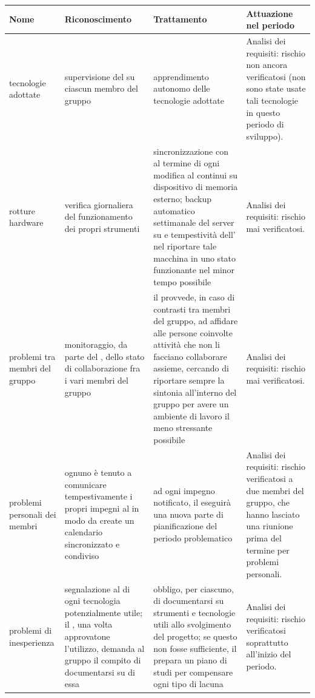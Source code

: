 \newpage

\begin{adjustwidth}{-1cm}{-1cm}
\begin{center}
\begin{longtable}{| p{3cm} | p{3.5cm} | p{4cm} | p{3cm} |}
	\hline
	\textbf{Nome} & \textbf{Riconoscimento} & \textbf{Trattamento} & \textbf{Attuazione nel periodo} \\
	\hline
	tecnologie adottate & supervisione del \Rx{} su ciascun membro del gruppo & apprendimento autonomo delle tecnologie adottate & Analisi dei requisiti: rischio non ancora verificatosi (non sono state usate tali tecnologie in questo periodo di sviluppo). \\
	rotture hardware & verifica giornaliera del funzionamento dei propri strumenti & sincronizzazione con \gloss{GitHub} al termine di ogni modifica al \gloss{repository} continui \gloss{backup} su dispositivo di memoria esterno; backup automatico settimanale del server su \gloss{AWS} e tempestività dell’\AM{} nel riportare tale macchina in uno stato funzionante nel minor tempo possibile & Analisi dei requisiti: rischio mai verificatosi. \\
	problemi tra membri del gruppo & monitoraggio, da parte del \Rx{}, dello stato di collaborazione fra i vari membri del gruppo & il \Rx{} provvede, in caso di contrasti tra membri del gruppo, ad affidare alle persone coinvolte attività che non li facciano collaborare assieme, cercando di riportare sempre la sintonia all'interno del gruppo per avere un ambiente di lavoro il meno stressante possibile & Analisi dei requisiti: rischio mai verificatosi. \\
	problemi personali dei membri & ognuno è tenuto a comunicare tempestivamente i propri impegni al \Rx{} in modo da create un calendario sincronizzato e condiviso & ad ogni impegno notificato, il \Rx{} eseguirà una nuova parte di pianificazione del periodo problematico & Analisi dei requisiti: rischio verificatosi  a due membri del gruppo, che hanno lasciato una riunione prima del termine per problemi personali. \\
	problemi di inesperienza & segnalazione al \Rx{} di ogni tecnologia potenzialmente utile; il \Rx{}, una volta approvatone l'utilizzo, demanda al gruppo il compito di documentarsi su di essa & obbligo, per ciascuno, di documentarsi su strumenti e tecnologie utili allo svolgimento del progetto; se questo non fosse sufficiente, il \Rx{} prepara un piano di studi per compensare ogni tipo di lacuna & Analisi dei requisiti: rischio verificatosi soprattutto all'inizio del periodo. \\

\end{longtable}
\end{center}
\end{adjustwidth}
